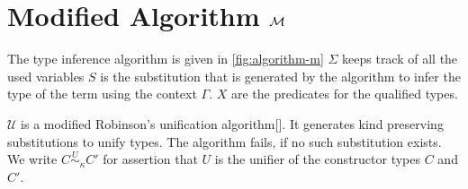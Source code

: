 \section{Modified Algorithm $\mathcal{M}$}
The type inference algorithm is given in \cref{fig:algorithm-m}
$\Sigma$ keeps track of all the used variables
$S$ is the substitution that is generated by the algorithm to infer the type of the
term using the context $\Gamma$. $X$ are the predicates for the qualified types.

$\mathcal{U}$ is a modified Robinson's unification algorithm[\cite{robinson_machine-oriented_1965}].
It generates kind preserving substitutions to unify types. The algorithm fails, if no such substitution exists.
We write $C \overset{U}{\sim}_{\kappa} C'$ for assertion that $U$ is the unifier
of the constructor types $C$ and $C'$.

